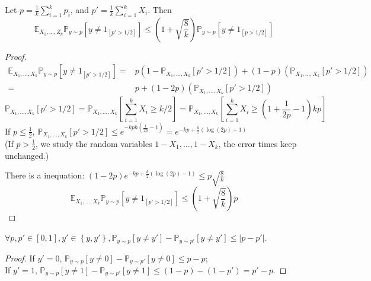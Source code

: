 \begin{lemma}
    Let $ p = \frac{1}{k} \sum^{k}_{i=1} p_i $, and $ p' = \frac{1}{k} \sum^{k}_{i=1} X_i $. Then
    \[
        \mathbb{E}_{X_1,\ldots, Z_k} \mathbb{P}_{y \sim p} \left[ y \ne 1_{\left[ p' > 1/2 \right]} \right]
        \le \left( 1 + \sqrt{\frac{8}{k} } \right) \mathbb{P}_{y \sim p} \left[ y \ne 1 _{\left[ p > 1/2 \right]} \right]
    \]
    \begin{proof}
        \begin{align*}
            \mathbb{E}_{X_1,\ldots, X_k} \mathbb{P}_{y \sim p} \left[ y \ne 1_{\left[ p' > 1/2 \right]} \right]
            =& p\left( 1 - \mathbb{P}_{X_1, \ldots, X_k} \left[ p' > 1/2 \right] \right)
            + \left( 1 - p \right) \left( \mathbb{P}_{X_1, \ldots, X_k} \left[ p' > 1/2 \right] \right)\\
            =& p + (1-2p) \left( \mathbb{P}_{X_1, \ldots, X_k} \left[ p' > 1/2 \right] \right)
        \end{align*}
        \[
            \mathbb{P}_{X_1, \ldots, X_k} \left[ p' > 1/2 \right] 
            = \mathbb{P}_{X_1, \ldots, X_k} \left[ \sum^{k}_{i=1} X_i \ge k/2 \right]
            = \mathbb{P}_{X_1, \ldots, X_k} \left[ \sum^{k}_{i=1} X_i \ge (1 + \frac{1}{2p} -1 ) kp\right]
        \]
        If $ p \le \frac{1}{2} $, $ \mathbb{P}_{X_1, \ldots, X_k} \left[ p' > 1/2 \right] \le e ^{-kp h \left( \frac{1}{2p} - 1 \right)} = e^{-kp + \frac{k}{2} \left( \log(2p) + 1 \right)} $\\
        (If $ p > \frac{1}{2} $, we study the random variables $ 1-X_1, \ldots, 1-X_k $, the error times keep unchanged.)

        There is a inequation: $ (1 - 2p)e^{-kp + \frac{k}{2} (\log(2p) - 1)} \le p\sqrt{\frac{8}{k} }$
        \[
            \mathbb{E}_{X_1,\ldots, X_k} \mathbb{P}_{y \sim p} \left[ y \ne 1_{\left[ p' > 1/2 \right]} \right]
            \le \left( 1 + \sqrt{\frac{8}{k} } \right) p
        \]
    \end{proof}
\end{lemma}

\begin{lemma}
    $ \forall p, p' \in [0, 1], y' \in \left\{ y, y' \right\}, \mathbb{P}_{y \sim p} \left[ y \ne y' \right] - \mathbb{P}_{y \sim p'}\left[ y \ne y' \right] \le \left| p - p' \right| $.
    \begin{proof}
        If $ y' = 0 $, $  \mathbb{P}_{y \sim p} \left[ y \ne 0 \right] - \mathbb{P}_{y \sim p'}\left[ y \ne 0 \right] \le p - p$;\\
        If $ y' = 1 $, $  \mathbb{P}_{y \sim p} \left[ y \ne 1 \right] - \mathbb{P}_{y \sim p'}\left[ y \ne 1 \right] \le (1 - p) - (1 - p') = p' - p $.
    \end{proof}
\end{lemma}

